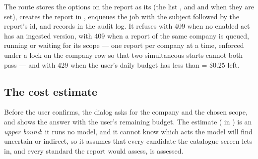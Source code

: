 The route stores the options on the report as its  (the list ,
and  and  when they are set), creates the report in
, enqueues the job  with the subject  followed
by the report's id, and records  in the audit log.
It refuses with 409  when no enabled act has an ingested version, with 409
 when a report of the same company is queued, running or waiting for its
scope --- one report per company at a time, enforced under a lock on the company row so that
two simultaneous starts cannot both pass --- and with 429  when the
user's daily budget has less than  = \$0.25 left.

\subsection{The cost estimate}\label{sec:report:estimate}

Before the user confirms, the dialog asks  for the company
and the chosen scope, and shows the answer with the user's remaining budget. The estimate
( in ) is an \emph{upper bound}: it runs no
model, and it cannot know which acts the model will find uncertain or indirect, so it assumes
that every candidate the catalogue screen lets in, and every standard the report would assess,
is assessed.


